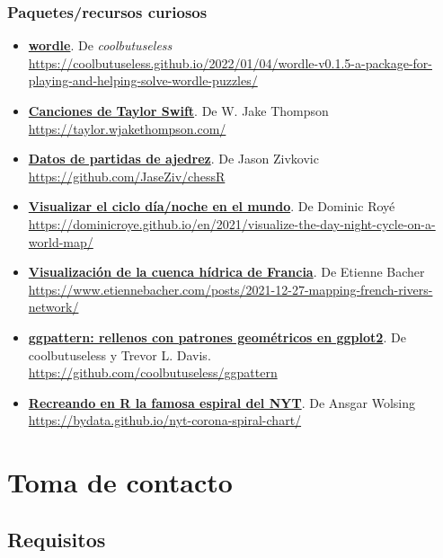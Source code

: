 \documentclass[11pt,]{book}
\begin{document}
\hypertarget{paquetesrecursos-curiosos}{%
\section*{Paquetes/recursos curiosos}\label{paquetesrecursos-curiosos}}


\begin{itemize}
\item
  \href{https://coolbutuseless.github.io/2022/01/04/wordle-v0.1.5-a-package-for-playing-and-helping-solve-wordle-puzzles/}{\textbf{wordle}}. De \emph{coolbutuseless} \url{https://coolbutuseless.github.io/2022/01/04/wordle-v0.1.5-a-package-for-playing-and-helping-solve-wordle-puzzles/}
\item
  \href{https://taylor.wjakethompson.com/}{\textbf{Canciones de Taylor Swift}}. De W. Jake Thompson \url{https://taylor.wjakethompson.com/}
\item
  \href{https://github.com/JaseZiv/chessR}{\textbf{Datos de partidas de ajedrez}}. De Jason Zivkovic \url{https://github.com/JaseZiv/chessR}
\item
  \href{https://dominicroye.github.io/en/2021/visualize-the-day-night-cycle-on-a-world-map/}{\textbf{Visualizar el ciclo día/noche en el mundo}}. De Dominic Royé \url{https://dominicroye.github.io/en/2021/visualize-the-day-night-cycle-on-a-world-map/}
\item
  \href{https://www.etiennebacher.com/posts/2021-12-27-mapping-french-rivers-network/}{\textbf{Visualización de la cuenca hídrica de Francia}}. De Etienne Bacher \url{https://www.etiennebacher.com/posts/2021-12-27-mapping-french-rivers-network/}
\item
  \href{https://github.com/coolbutuseless/ggpattern}{\textbf{ggpattern: rellenos con patrones geométricos en ggplot2}}. De coolbutuseless y Trevor L. Davis. \url{https://github.com/coolbutuseless/ggpattern}
\item
  \href{https://bydata.github.io/nyt-corona-spiral-chart/}{\textbf{Recreando en R la famosa espiral del NYT}}. De Ansgar Wolsing \url{https://bydata.github.io/nyt-corona-spiral-chart/}
\end{itemize}

\hypertarget{part-toma-de-contacto}{%
\part{Toma de contacto}\label{part-toma-de-contacto}}

\hypertarget{requisitos}{%
\chapter{Requisitos}\label{requisitos}}
\end{document}
